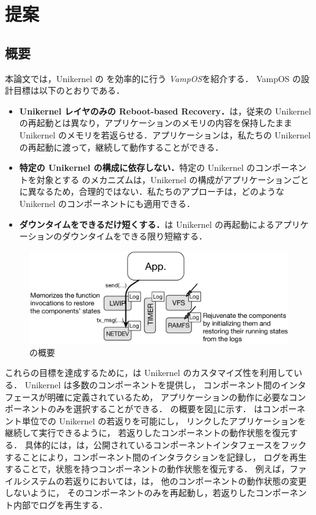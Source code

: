 \section{提案} \label{sec:proposal}

\subsection{概要}

本論文では，Unikernel の \rr を効率的に行う \emph{VampOS}を紹介する．
VampOS の設計目標は以下のとおりである．

\begin{itemize}
    \item \textbf{Unikernel レイヤのみの Reboot-based Recovery．}{\sysname は，従来の Unikernel の再起動とは異なり，アプリケーションのメモリの内容を保持したまま Unikernel のメモリを若返らせる．アプリケーションは，私たちの Unikernel の再起動に渡って，継続して動作することができる．}
    \item \textbf{特定の Unikernel の構成に依存しない．}{特定の Unikernel のコンポーネントを対象とする \rr のメカニズムは，Unikernel の構成がアプリケーションごとに異なるため，合理的ではない．私たちのアプローチは，どのような Unikernel のコンポーネントにも適用できる．}
    \item \textbf{ダウンタイムをできるだけ短くする．}{\sysname は Unikernel の再起動によるアプリケーションのダウンタイムをできる限り短縮する．}
\end{itemize}

\begin{figure}[t]
    \begin{center}
      \includegraphics[scale=0.3]{./img/vampos.eps}
      \caption{{\sysname} の概要} 
      \label{fig:overview}
    \end{center}
\end{figure}

これらの目標を達成するために，\sysname は Unikernel のカスタマイズ性を利用している．
Unikernel は多数のコンポーネントを提供し，
コンポーネント間のインタフェースが明確に定義されているため，
アプリケーションの動作に必要なコンポーネントのみを選択することができる．
\sysname の概要を図\ref{fig:overview}に示す．
\sysname はコンポーネント単位での Unikernel の若返りを可能にし，
リンクしたアプリケーションを継続して実行できるように，
若返りしたコンポーネントの動作状態を復元する．
具体的には，\sysname は，公開されているコンポーネントインタフェースをフックすることにより，コンポーネント間のインタラクションを記録し，
ログを再生することで，状態を持つコンポーネントの動作状態を復元する．
例えば，ファイルシステムの若返りにおいては，\sysname は，
他のコンポーネントの動作状態の変更しないように，
そのコンポーネントのみを再起動し，若返りしたコンポーネント内部でログを再生する．

